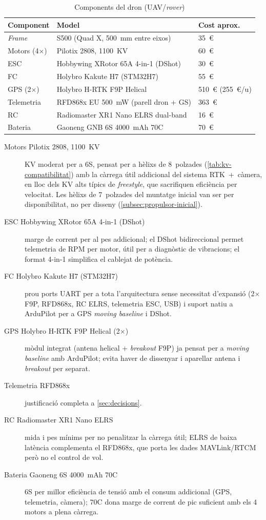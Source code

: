 \begin{table}[H]
    \centering
    \caption{Components del dron (UAV/\emph{rover})}
    \label{tab:materials-dron}
    \begin{tabular}{lll}
        \toprule
        Component & Model & Cost aprox. \\
        \midrule
        \emph{Frame} & S500 (Quad X, 500~mm entre eixos) & 35~€ \\
        Motors (4$\times$) & Pilotix 2808, 1100~KV & 60~€ \\
        ESC & Hobbywing XRotor 65A 4-in-1 (DShot) & 30~€ \\
        FC & Holybro Kakute H7 (STM32H7) & 55~€ \\
        GPS (2$\times$) & Holybro H-RTK F9P Helical & 510~€ (255~€/u) \\
        Telemetria & RFD868x EU 500~mW (parell dron + GS) & 363~€ \\
        RC & Radiomaster XR1 Nano ELRS dual-band & 16~€ \\
        Bateria & Gaoneng GNB 6S 4000~mAh 70C & 70~€ \\
        \bottomrule
    \end{tabular}
\end{table}

\begin{description}
    \item[Motors Pilotix 2808, 1100~KV] KV moderat per a 6S, pensat per a hèlixs de 8~polzades (\cref{tab:kv-compatibilitat}) amb la càrrega útil addicional del sistema RTK~+~càmera, en lloc dels KV alts típics de \emph{freestyle}, que sacrifiquen eficiència per velocitat. Les hèlixs de 7~polzades del muntatge inicial van ser per disponibilitat, no per disseny (\cref{subsec:propulsor-inicial}).
    \item[ESC Hobbywing XRotor 65A 4-in-1 (DShot)] marge de corrent per al pes addicional; el DShot bidireccional permet telemetria de RPM per motor, útil per a diagnòstic de vibracions; el format 4-in-1 simplifica el cablejat de potència.
    \item[FC Holybro Kakute H7 (STM32H7)] prou ports UART per a tota l'arquitectura sense necessitat d'expansió (2$\times$F9P, RFD868x, RC ELRS, telemetria ESC, USB) i suport natiu a ArduPilot per a GPS \emph{moving baseline} i DShot.
    \item[GPS Holybro H-RTK F9P Helical (2$\times$)] mòdul integrat (antena helical + \emph{breakout} F9P) ja pensat per a \emph{moving baseline} amb ArduPilot; evita haver de dissenyar i aparellar antena i \emph{breakout} per separat.
    \item[Telemetria RFD868x] justificació completa a \cref{sec:decisions}.
    \item[RC Radiomaster XR1 Nano ELRS] mida i pes mínims per no penalitzar la càrrega útil; ELRS de baixa latència complementa el RFD868x, que porta les dades MAVLink/RTCM però no el control de vol.
    \item[Bateria Gaoneng 6S 4000~mAh 70C] 6S per millor eficiència de tensió amb el consum addicional (GPS, telemetria, càmera); 70C dona marge de corrent de pic suficient amb els 4 motors a plena càrrega.
\end{description}

